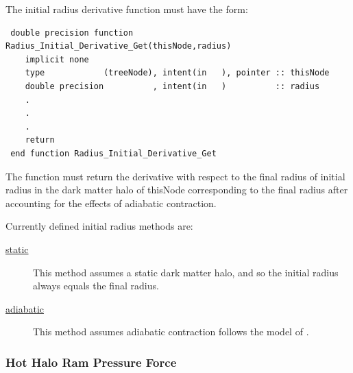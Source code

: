 The initial radius derivative function must have the form:
\begin{verbatim}
 double precision function Radius_Initial_Derivative_Get(thisNode,radius)
    implicit none
    type            (treeNode), intent(in   ), pointer :: thisNode
    double precision          , intent(in   )          :: radius
    .
    .
    .
    return
 end function Radius_Initial_Derivative_Get
\end{verbatim}
The function must return the derivative with respect to the final {\normalfont \ttfamily radius} of initial radius in the dark matter halo of {\normalfont \ttfamily thisNode} corresponding to the final {\normalfont \ttfamily radius} after accounting for the effects of adiabatic contraction.

Currently defined initial radius methods are:
\begin{description}
 \item [\hyperlink{galactic_structure.radius_solver.initial_radii.static.F90:galactic_structure_initial_radii_static:galactic_structure_radius_initial_static}{{\normalfont \ttfamily static}}] This method assumes a static dark matter halo, and so the initial radius always equals the final radius.
 \item [\hyperlink{galactic_structure.radius_solver.initial_radii.adiabatic.F90:galactic_structure_initial_radii_adiabatic:galactic_structure_radius_initial_adiabatic}{{\normalfont \ttfamily adiabatic}}] This method assumes adiabatic contraction follows the model of \cite{gnedin_response_2004}.
\end{description}


\subsubsection{Hot Halo Ram Pressure Force}

